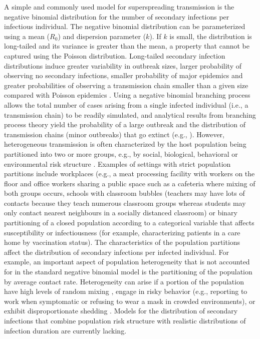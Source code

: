 \documentclass{imammb}
\numberwithin{equation}{section}
\begin{document}
A simple and commonly used model for superspreading transmission is the negative binomial distribution for the number of secondary infections per infectious individual. The negative binomial distribution can be parameterized using a mean ($R_0$) and dispersion parameter ($k$). If $k$ is small, the distribution is long-tailed and its variance is greater than the mean, a property that cannot be captured using the Poisson distribution. Long-tailed secondary infection distributions induce greater variability in outbreak sizes, larger probability of observing no secondary infections, smaller probability of major epidemics and greater probabilities of observing a transmission chain smaller than a given size compared with Poisson epidemics \citep{Althouse2020-dn}. Using a negative binomial branching process allows 
the total number of cases arising from a single infected individual (i.e., a transmission chain) to be readily simulated, and analytical results from branching process theory yield the probability of a large outbreak \citep{Mode2000-hp} and the distribution of transmission chains (minor outbreaks) that go extinct (e.g., \citep{Blumberg2013-xv}).  However, heterogeneous transmission is often characterized by the host population being partitioned into two or more groups, e.g., by social, biological, behavioral or environmental risk structure \citep{Keeling2008-sh, Rock2014-nc}. Examples of settings with strict population partitions include workplaces (e.g., a meat processing facility with workers on the floor and office workers sharing a public space such as a cafeteria where mixing of both groups occurs, schools with classroom bubbles (teachers may have lots of contacts because they teach numerous classroom groups whereas students may only contact nearest neighbours in a socially distanced classroom) or binary partitioning of a closed population according to a categorical variable that affects susceptibility or infectiousness (for example, characterizing patients in a care home by vaccination status).  The characteristics of the population partitions affect the distribution of secondary infections per infected individual. For example, an important aspect of population heterogeneity that is not accounted for in the standard negative binomial model is the partitioning of the population by average contact rate. Heterogeneity can arise if a portion of the population have high levels of random mixing \citep{Sneppen2021-mr}, engage in risky behavior (e.g., reporting to work when symptomatic or refusing to wear a mask in crowded environments), or exhibit disproportionate shedding \citep{Goyal2021-xr}.  Models for the distribution of secondary infections that combine population risk structure with realistic distributions of infection duration are currently lacking.
 
\end{document}
